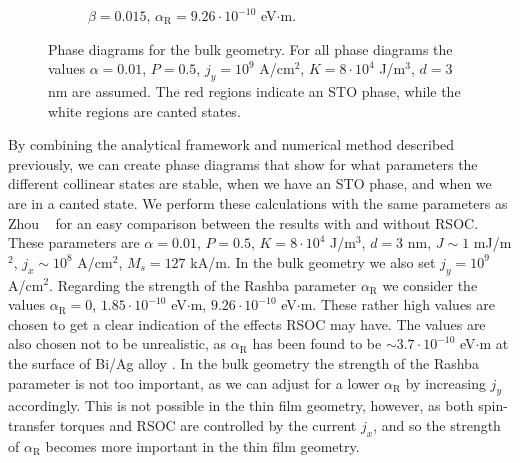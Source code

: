 \begin{figure}[h!]
\begin{subfigure}{.49\textwidth}
  \caption{$\beta = 0.015$, $\alpha_\text{R} = 9.26\cdot10^{-10}$ eV$\cdot$m.}
  \label{fig:BulkXi15R25}
\end{subfigure}
\caption{Phase diagrams for the bulk geometry. For all phase diagrams the values $\alpha=0.01$, $P=0.5$, $j_y=10^9$ A/cm$^2$, $K=8\cdot10^4$ J/m$^3$, $d=3$ nm are assumed. The red regions indicate an STO phase, while the white regions are canted states. }
\label{fig:STOBulkPhase}
\end{figure}
By combining the analytical framework and numerical method described previously, we can create phase diagrams that show for what parameters the different collinear states are stable, when we have an STO phase, and when we are in a canted state. We perform these calculations with the same parameters as Zhou \etal~\cite{Zhou2013} for an easy comparison between the results with and without RSOC. These parameters are $\alpha=0.01$, $P=0.5$, $K=8\cdot10^4$ J/m$^3$, $d=3$ nm, $J \sim 1$ mJ/m$^2$, $j_x\sim 10^8$ A/cm$^2$, $M_s = 127$ kA/m. In the bulk geometry we also set $j_y=10^9$ A/cm$^2$. Regarding the strength of the Rashba parameter $\alpha_{\text{R}}$ we consider the values $\alpha_{\text{R}}=0$, $1.85\cdot10^{-10}$ eV$\cdot$m, $9.26\cdot10^{-10}$ eV$\cdot$m. These rather high values are chosen to get a clear indication of the effects RSOC may have. The values are also chosen not to be unrealistic, as $\alpha_{\text{R}}$ has been found to be $\sim 3.7 \cdot 10^{-10}$ eV$\cdot$m at the surface of Bi/Ag alloy \cite{Manchon2015}. In the bulk geometry the strength of the Rashba parameter is not too important, as we can adjust for a lower $\alpha_{\text{R}}$ by increasing $j_y$ accordingly. This is not possible in the thin film geometry, however, as both spin-transfer torques and RSOC are controlled by the current $j_x$, and so the strength of $\alpha_{\text{R}}$ becomes more important in the thin film geometry. 

